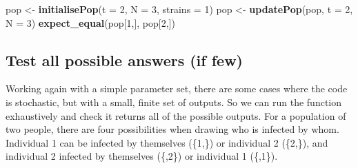 \documentclass[10pt,letterpaper]{article}
\newenvironment{Shaded}{\begin{snugshade}}{\end{snugshade}}
\newcommand{\CommentTok}[1]{\textcolor[rgb]{0.56,0.35,0.01}{\textit{#1}}}
\newcommand{\DataTypeTok}[1]{\textcolor[rgb]{0.13,0.29,0.53}{#1}}
\newcommand{\DecValTok}[1]{\textcolor[rgb]{0.00,0.00,0.81}{#1}}
\newcommand{\KeywordTok}[1]{\textcolor[rgb]{0.13,0.29,0.53}{\textbf{#1}}}
\newcommand{\NormalTok}[1]{#1}
\newcommand{\OperatorTok}[1]{\textcolor[rgb]{0.81,0.36,0.00}{\textbf{#1}}}
\newcommand{\StringTok}[1]{\textcolor[rgb]{0.31,0.60,0.02}{#1}}
\begin{document}
\begin{Shaded}
\begin{Highlighting}[]
\NormalTok{pop <-}\StringTok{ }\KeywordTok{initialisePop}\NormalTok{(}\DataTypeTok{t =} \DecValTok{2}\NormalTok{, }\DataTypeTok{N =} \DecValTok{3}\NormalTok{, }\DataTypeTok{strains =} \DecValTok{1}\NormalTok{) }
\NormalTok{pop <-}\StringTok{ }\KeywordTok{updatePop}\NormalTok{(pop, }\DataTypeTok{t =} \DecValTok{2}\NormalTok{, }\DataTypeTok{N =} \DecValTok{3}\NormalTok{)}
\KeywordTok{expect_equal}\NormalTok{(pop[}\DecValTok{1}\NormalTok{,], pop[}\DecValTok{2}\NormalTok{,])}
\end{Highlighting}
\end{Shaded}

\hypertarget{allpossible}{%
\subsection*{Test all possible answers (if few)}\label{allpossible}}

Working again with a simple parameter set, there are some cases where the code is stochastic, but with a small, finite set of outputs.
So we can run the function exhaustively and check it returns all of the possible outputs.
For a population of two people, there are four possibilities when drawing who is infected by whom.
Individual 1 can be infected by themselves (\{1,\}) or individual 2 (\{2,\}), and individual 2 infected by themselves (\{,2\}) or individual 1 (\{,1\}).
\newline
{}\label{test_stoch_fewvalues}

\begin{Shaded}
\end{Shaded}
\end{document}
